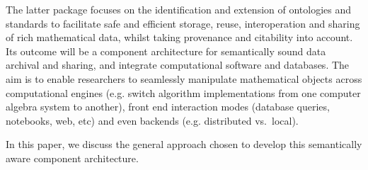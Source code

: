The latter package focuses on the identification and extension of ontologies and standards
to facilitate safe and efficient storage, reuse, interoperation and sharing of rich mathematical
data, whilst taking provenance and citability into account.
Its outcome will be a component architecture for semantically sound data archival and sharing,
and integrate computational software and databases. The aim is to enable researchers to seamlessly
manipulate mathematical objects across computational engines (e.g. switch algorithm implementations
from one computer algebra system to another), front end interaction modes (database queries, notebooks,
web, etc) and even backends (e.g. distributed vs.~local).

In this paper, we discuss the general approach chosen to develop this semantically aware component
architecture. 



